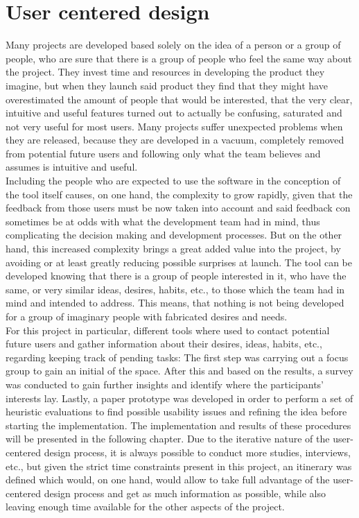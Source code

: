\chapter{User centered design}
Many projects are developed based solely on the idea of a person or a group of people, who are sure that there is a group of people who feel the same way about the project. They invest time and resources in developing the product they imagine, but when they launch said product they find that they might have overestimated the amount of people that would be interested, that the very clear, intuitive and useful features turned out to actually be confusing, saturated and not very useful for most users. Many projects suffer unexpected problems when they are released, because they are developed in a vacuum, completely removed from potential future users and following only what the team believes and assumes is intuitive and useful.\\
Including the people who are expected to use the software in the conception of the tool itself causes, on one hand, the complexity to grow rapidly, given that the feedback from those users must be now taken into account and said feedback con sometimes be at odds with what the development team had in mind, thus complicating the decision making and development processes. But on the other hand, this increased complexity brings a great added value into the project, by avoiding or at least greatly reducing possible surprises at launch.  The tool can be developed knowing that there is a group of people interested in it, who have the same, or very similar ideas, desires, habits, etc., to those which the team had in mind and intended to address. This means, that nothing is not being developed for a group of imaginary people with fabricated desires and needs.\\
For this project in particular, different tools where used to contact potential future users and gather information about their desires, ideas, habits, etc., regarding keeping track of pending tasks: The first step was carrying out a focus group to gain an initial of the space. After this and based on the results, a survey was conducted to gain further insights and identify where the participants' interests lay. Lastly, a paper prototype was developed in order to perform a set of heuristic evaluations to find possible usability issues and refining the idea before starting the implementation. The implementation and results of these procedures will be presented in the following chapter. Due to the iterative nature of the user-centered design process, it is always possible to conduct more studies, interviews, etc., but given the strict time constraints present in this project, an itinerary was defined which would, on one hand, would allow to take full advantage of the user-centered design process and get as much information as possible, while also leaving enough time available for the other aspects of the project.

